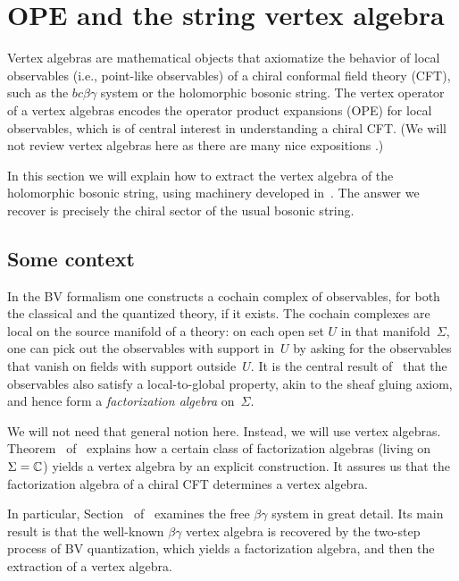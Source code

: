 \section{OPE and the string vertex algebra}

Vertex algebras are mathematical objects that axiomatize the behavior of local observables 
(i.e., point-like observables) of a chiral conformal field theory (CFT),
such as the $bc\beta\gamma$ system or the holomorphic bosonic string.
The vertex operator of a vertex algebras encodes the operator product expansions (OPE) for local observables,
which is of central interest in understanding a chiral CFT.
(We will not review vertex algebras here
as there are many nice expositions .)

In this section we will explain how to extract the vertex algebra of the holomorphic bosonic string,
using machinery developed in~\cite{CG1,LiVA,CDO}.
The answer we recover is precisely the chiral sector of the usual bosonic string.

\subsection{Some context}

In the BV formalism one constructs a cochain complex of observables,
for both the classical and the quantized theory, if it exists.
The cochain complexes are local on the source manifold of a theory:
on each open set $U$ in that manifold~$\Sigma$,
one can pick out the observables with support in~$U$ by asking for the observables that vanish on fields with support outside~$U$.
It is the central result of~\cite{CG1,CG2} that the observables also satisfy a local-to-global property,
akin to the sheaf gluing axiom,
and hence form a {\em factorization algebra} on~$\Sigma$.

We will not need that general notion here.
Instead, we will use vertex algebras.
Theorem~ of~\cite{CG1} explains how a certain class of factorization algebras (living on $\Sigma = \mathbb C$) yields a vertex algebra by an explicit construction.
It assures us that the factorization algebra of a chiral CFT determines a vertex algebra.

In particular, Section~ of~\cite{CG1} examines the free $\beta\gamma$ system in great detail.
Its main result is that the well-known $\beta\gamma$ vertex algebra is recovered by the two-step process of BV quantization, which yields a factorization algebra, and then the extraction of a vertex algebra.

